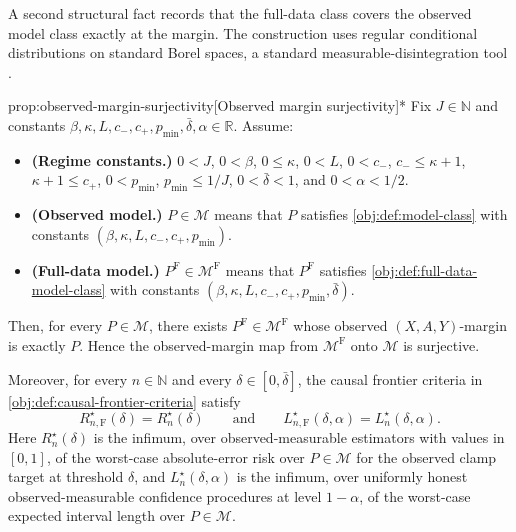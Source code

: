 A second structural fact records that the full-data class covers the observed model class exactly at the margin. The construction uses regular conditional distributions on standard Borel spaces, a standard measurable-disintegration tool \citep[Theorem 6.3]{Kallenberg2002Foundations}.

\begin{propositionv}{prop:observed-margin-surjectivity}[Observed margin surjectivity]*
Fix \(J\in\mathbb N\) and constants \(\beta,\kappa,L,c_-,c_+,p_{\min},\bar\delta,\alpha\in\mathbb R\). Assume:
\begin{itemize}
\item \textbf{(Regime constants.)} \(0<J\), \(0<\beta\), \(0\leq \kappa\), \(0<L\), \(0<c_-\), \(c_-\leq \kappa+1\), \(\kappa+1\leq c_+\), \(0<p_{\min}\), \(p_{\min}\leq 1/J\), \(0<\bar\delta<1\), and \(0<\alpha<1/2\).
\item \textbf{(Observed model.)} \(P\in\mathcal M\) means that \(P\) satisfies \cref{obj:def:model-class} with constants \((\beta,\kappa,L,c_-,c_+,p_{\min})\).
\item \textbf{(Full-data model.)} \(P^{\mathrm F}\in\mathcal M^{\mathrm F}\) means that \(P^{\mathrm F}\) satisfies \cref{obj:def:full-data-model-class} with constants \((\beta,\kappa,L,c_-,c_+,p_{\min},\bar\delta)\).
\end{itemize}
Then, for every \(P\in\mathcal M\), there exists \(P^{\mathrm F}\in\mathcal M^{\mathrm F}\) whose observed \((X,A,Y)\)-margin is exactly \(P\). Hence the observed-margin map from \(\mathcal M^{\mathrm F}\) onto \(\mathcal M\) is surjective.

Moreover, for every \(n\in\mathbb N\) and every \(\delta\in[0,\bar\delta]\), the causal frontier criteria in \cref{obj:def:causal-frontier-criteria} satisfy
\[
R_{n,\mathrm F}^{\star}(\delta)=R_n^\star(\delta)
\qquad\text{and}\qquad
L_{n,\mathrm F}^{\star}(\delta,\alpha)=L_n^\star(\delta,\alpha).
\]
Here \(R_n^\star(\delta)\) is the infimum, over observed-measurable estimators with values in \([0,1]\), of the worst-case absolute-error risk over \(P\in\mathcal M\) for the observed clamp target at threshold \(\delta\), and \(L_n^\star(\delta,\alpha)\) is the infimum, over uniformly honest observed-measurable confidence procedures at level \(1-\alpha\), of the worst-case expected interval length over \(P\in\mathcal M\).
\end{propositionv}

